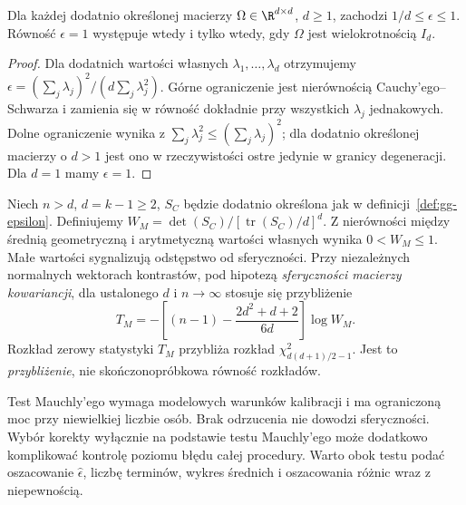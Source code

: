 \begin{twierdzenie}\label{thm:gg-bound}
Dla każdej dodatnio określonej macierzy $\Omega\in\R^{d\times d}$, $d\ge1$, zachodzi $1/d\le\epsilon\le1$. Równość $\epsilon=1$ występuje wtedy i tylko wtedy, gdy $\Omega$ jest wielokrotnością $I_d$.
\end{twierdzenie}
\begin{proof}
Dla dodatnich wartości własnych $\lambda_1,\ldots,\lambda_d$ otrzymujemy $\epsilon=(\sum_j\lambda_j)^2/(d\sum_j\lambda_j^2)$. Górne ograniczenie jest nierównością Cauchy'ego--Schwarza i zamienia się w równość dokładnie przy wszystkich $\lambda_j$ jednakowych. Dolne ograniczenie wynika z $\sum_j\lambda_j^2\le(\sum_j\lambda_j)^2$; dla dodatnio określonej macierzy o $d>1$ jest ono w rzeczywistości ostre jedynie w granicy degeneracji. Dla $d=1$ mamy $\epsilon=1$.
\end{proof}

\begin{definicja}\label{def:mauchly}
Niech $n>d$, $d=k-1\ge2$, $S_C$ będzie dodatnio określona jak w definicji~\ref{def:gg-epsilon}. Definiujemy $W_M=\det(S_C)/[\operatorname{tr}(S_C)/d]^d$. Z nierówności między średnią geometryczną i arytmetyczną wartości własnych wynika $0<W_M\le1$. Małe wartości sygnalizują odstępstwo od sferyczności. Przy niezależnych normalnych wektorach kontrastów, pod hipotezą \emph{sferyczności macierzy kowariancji}, dla ustalonego $d$ i $n\to\infty$ stosuje się przybliżenie
\[
 T_M=-\left[(n-1)-\frac{2d^2+d+2}{6d}\right]\log W_M.
\]
Rozkład zerowy statystyki $T_M$ przybliża rozkład $\chi^2_{d(d+1)/2-1}$. Jest to \emph{przybliżenie}, nie skończonopróbkowa równość rozkładów.
\end{definicja}

\begin{uwaga}
Test Mauchly'ego wymaga modelowych warunków kalibracji i ma ograniczoną moc przy niewielkiej liczbie osób. Brak odrzucenia nie dowodzi sferyczności. Wybór korekty wyłącznie na podstawie testu Mauchly'ego może dodatkowo komplikować kontrolę poziomu błędu całej procedury. Warto obok testu podać oszacowanie $\widehat\epsilon$, liczbę terminów, wykres średnich i oszacowania różnic wraz z niepewnością.
\end{uwaga}

